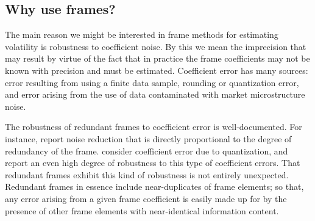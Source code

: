 \subsection{Why use frames?}\label{sub:why}
The main reason we might be interested in frame methods for estimating volatility is robustness to coefficient noise. By this we mean the imprecision that may result by virtue of the fact that in practice the frame coefficients may not be known with precision and must be estimated. Coefficient error has many sources: error resulting from using a finite data sample, rounding or quantization error,  and error arising from the use of data contaminated with market microstructure noise. 


The robustness of redundant frames to coefficient error is well-documented. For instance, \cite{Munch1992} report noise reduction that is directly proportional to the degree of redundancy of the frame. \cite{Cvetkovic1998} consider coefficient error due to quantization, and report an even high degree of robustness to this type of coefficient errors. That redundant frames exhibit this kind of robustness is not entirely unexpected. Redundant frames in essence include near-duplicates of frame elements; so that, any error arising from a given frame coefficient is easily made up for by the presence of other frame elements with near-identical information content. 


